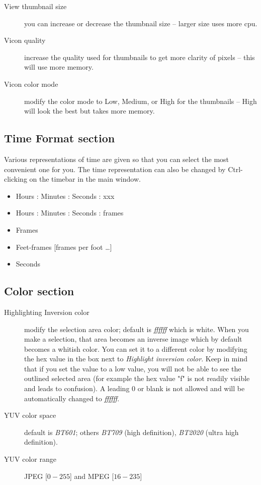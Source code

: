 \begin{description}
    \item[View thumbnail size] you can increase or decrease the thumbnail size -- larger size uses more cpu.
    \item[Vicon quality]  increase the quality used for thumbnails to get more clarity of pixels -- this will use
    more memory.
    \item[Vicon color mode] modify the color mode to Low, Medium, or High for the thumbnails -- High will
    look the best but takes more memory.
\end{description}

\subsection{Time Format section}%
\label{sub:time_format_section}

Various representations of time are given so that you can select the most convenient one for you. The time representation can also be changed by Ctrl-clicking on the timebar in the main window.

\begin{itemize}[noitemsep]
    \item Hours : Minutes : Seconds : xxx
    \item Hours : Minutes : Seconds : frames
    \item Frames
    \item Feet-frames  [frames per foot \dots]
    \item Seconds
\end{itemize}

\subsection{Color section}%
\label{sub:color_section}

\begin{description}
    \item[Highlighting Inversion color] modify the selection area color; default is \textit{ffffff} which is white. When you make a selection, that area becomes an inverse image which by default becomes a whitish color.  You can set it to a different color by modifying the hex value in the box next to \textit{Highlight inversion color}.   Keep in mind that if you set the value to a low value, you will not be able to see the outlined selected area (for example the hex value "f" is not readily visible and leads to confusion).  A leading 0 or blank is not allowed and will be automatically changed to \textit{ffffff}.
    \item[YUV color space] default is \textit{BT601}; others \textit{BT709} (high definition), \textit{BT2020} (ultra high definition).
    \item[YUV color range] JPEG [$0-255$] and MPEG [$16-235$]
\end{description}

